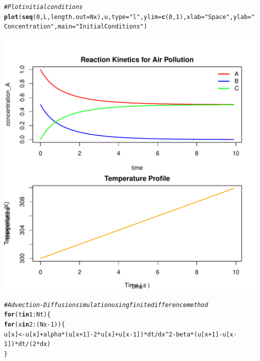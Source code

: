 \documentclass{tufte-handout}\usepackage[]{graphicx}\usepackage[]{xcolor}
\makeatletter
\def\maxwidth{ %
  \ifdim\Gin@nat@width>\linewidth
    \linewidth
  \else
    \Gin@nat@width
  \fi
}
\newcommand{\hlnum}[1]{\textcolor[rgb]{0.686,0.059,0.569}{#1}}%
\newcommand{\hlstr}[1]{\textcolor[rgb]{0.192,0.494,0.8}{#1}}%
\newcommand{\hlcom}[1]{\textcolor[rgb]{0.678,0.584,0.686}{\textit{#1}}}%
\newcommand{\hlopt}[1]{\textcolor[rgb]{0,0,0}{#1}}%
\newcommand{\hlstd}[1]{\textcolor[rgb]{0.345,0.345,0.345}{#1}}%
\newcommand{\hlkwa}[1]{\textcolor[rgb]{0.161,0.373,0.58}{\textbf{#1}}}%
\newcommand{\hlkwb}[1]{\textcolor[rgb]{0.69,0.353,0.396}{#1}}%
\newcommand{\hlkwc}[1]{\textcolor[rgb]{0.333,0.667,0.333}{#1}}%
\newcommand{\hlkwd}[1]{\textcolor[rgb]{0.737,0.353,0.396}{\textbf{#1}}}%
\newenvironment{kframe}{%
 \def\at@end@of@kframe{}%
 \ifinner\ifhmode%
  \def\at@end@of@kframe{\end{minipage}}%
  \begin{minipage}{\columnwidth}%
 \fi\fi%
 \def\FrameCommand##1{\hskip\@totalleftmargin \hskip-\fboxsep
 \colorbox{shadecolor}{##1}\hskip-\fboxsep
     \hskip-\linewidth \hskip-\@totalleftmargin \hskip\columnwidth}%
 \MakeFramed {\advance\hsize-\width
   \@totalleftmargin\z@ \linewidth\hsize
   \@setminipage}}%
 {\par\unskip\endMakeFramed%
 \at@end@of@kframe}
\newenvironment{knitrout}{}{} %
\makeatother
\begin{document}
\begin{knitrout}
\begin{kframe}
\begin{alltt}
\hlcom{# Plot initial conditions}
\hlkwd{plot}\hlstd{(}\hlkwd{seq}\hlstd{(}\hlnum{0}\hlstd{, L,} \hlkwc{length.out} \hlstd{= Nx), u,} \hlkwc{type} \hlstd{=} \hlstr{"l"}\hlstd{,} \hlkwc{ylim} \hlstd{=} \hlkwd{c}\hlstd{(}\hlnum{0}\hlstd{,} \hlnum{1}\hlstd{),} \hlkwc{xlab} \hlstd{=} \hlstr{"Space"}\hlstd{,} \hlkwc{ylab} \hlstd{=} \hlstr{"Concentration"}\hlstd{,} \hlkwc{main} \hlstd{=} \hlstr{"Initial Conditions"}\hlstd{)}
\end{alltt}
\end{kframe}
\includegraphics[width=\maxwidth]{figure/unnamed-chunk-2-1} 
\begin{kframe}\begin{alltt}
\hlcom{# Advection-Diffusion simulation using finite difference method}
\hlkwa{for} \hlstd{(t} \hlkwa{in} \hlnum{1}\hlopt{:}\hlstd{Nt) \{}
  \hlkwa{for} \hlstd{(x} \hlkwa{in} \hlnum{2}\hlopt{:}\hlstd{(Nx} \hlopt{-} \hlnum{1}\hlstd{)) \{}
    \hlstd{u[x]} \hlkwb{<-} \hlstd{u[x]} \hlopt{+} \hlstd{alpha} \hlopt{*} \hlstd{(u[x} \hlopt{+} \hlnum{1}\hlstd{]} \hlopt{-} \hlnum{2} \hlopt{*} \hlstd{u[x]} \hlopt{+} \hlstd{u[x} \hlopt{-} \hlnum{1}\hlstd{])} \hlopt{*} \hlstd{dt} \hlopt{/} \hlstd{dx}\hlopt{^}\hlnum{2} \hlopt{-} \hlstd{beta} \hlopt{*} \hlstd{(u[x} \hlopt{+} \hlnum{1}\hlstd{]} \hlopt{-} \hlstd{u[x} \hlopt{-} \hlnum{1}\hlstd{])} \hlopt{*} \hlstd{dt} \hlopt{/} \hlstd{(}\hlnum{2} \hlopt{*} \hlstd{dx)}
  \hlstd{\}}


\end{alltt}
\end{kframe}
\end{knitrout}
\end{document}
